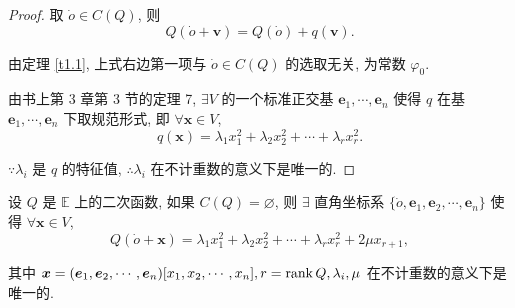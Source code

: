 \documentclass[color=black,device=normal,lang=cn,mode=geye]{elegantnote}
\begin{document}
\begin{proof}
    取 $\dot{o}\in C(Q)$, 则
    \[Q(\dot{o}+\boldsymbol{v})=Q(\dot{o})+q(\boldsymbol{v}).\]

    由定理 \ref{t1.1}, 上式右边第一项与 $\dot{o}\in C(Q)$ 的选取无关, 为常数 $\varphi_0$.

    由书上第 3 章第 3 节的定理 7, $\exists V$ 的一个标准正交基 $\boldsymbol{e}_1,\cdots,\boldsymbol{e}_n$ 使得 $q$ 在基 $\boldsymbol{e}_1,\cdots,\boldsymbol{e}_n$ 下取规范形式, 即 $\forall\boldsymbol{x}\in V$,
    \[q(\boldsymbol{x})=\lambda_1x^2_1+\lambda_2x^2_2+\cdots+\lambda_rx^2_r.\]

    $\because\lambda_i$ 是 $q$ 的特征值, $\therefore\lambda_i$ 在不计重数的意义下是唯一的.
\end{proof}
\begin{theorem}
    设 $Q$ 是 $\mathbb{E}$ 上的二次函数, 如果 $C(Q)=\varnothing$, 则 $\exists$ 直角坐标系 $\{\dot{o},\boldsymbol{e}_1,\boldsymbol{e}_2,\cdots,\boldsymbol{e}_n\}$ 使得 $\forall\boldsymbol{x}\in V$,
    \[Q(\dot{o}+\boldsymbol{x})=\lambda_1x^2_1+\lambda_2x^2_2+\cdots+\lambda_rx^2_r+2\mu x_{r+1},\]

    其中 $\boldsymbol{x}=(\boldsymbol{e}_1,\boldsymbol{e}_2,\cdots,\boldsymbol{e}_n)[x_1,x_2,\cdots,x_n],r=\operatorname{rank} Q,\lambda_i,\mu$ 在不计重数的意义下是唯一的.
\end{theorem}
\end{document}
